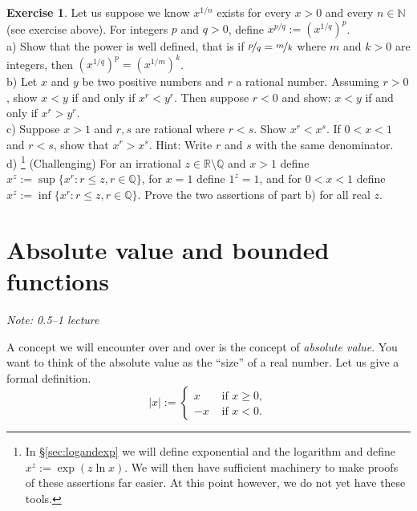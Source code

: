 \documentclass[12pt]{book}
\newcommand{\abs}[1]{\left\lvert {#1} \right\rvert}
\newcommand{\R}{{\mathbb{R}}}
\newcommand{\N}{{\mathbb{N}}}
\newcommand{\Q}{{\mathbb{Q}}}
\newcommand{\myindex}[1]{#1\index{#1}}
\newcommand{\sectionnotes}[1]{\noindent \emph{Note: #1} \medskip \par}
\newcommand{\sectionnewpage}{\clearpage}
\theoremstyle{plain}
\theoremstyle{remark}
\theoremstyle{definition}
\theoremstyle{exercise}
\newtheorem{exercise}{Exercise}[section]
\theoremstyle{example}
\newcommand{\sectionref}[1]{\hyperref[#1]{\S\ref*{#1}}}
\begin{document}
\begin{exercise} \label{exercise:realpower}
Let us suppose we know $x^{1/n}$ exists for every $x > 0$ and every $n \in
\N$ (see exercise above).  For integers $p$ and $q > 0$, define $x^{p/q} :=
{(x^{1/q})}^p$.\\
a) Show that the power is well defined, that is if $\nicefrac{p}{q} =
\nicefrac{m}{k}$ where $m$ and $k > 0$ are integers, then 
${(x^{1/q})}^p = {(x^{1/m})}^k$.
\\
b)
Let $x$ and $y$ be two positive numbers and $r$ a rational number.
Assuming $r > 0$, show
$x < y$ if and only if $x^r < y^r$.  Then suppose $r < 0$ and show:
$x < y$ if and only if $x^r > y^r$.
\\
c) 
Suppose $x > 1$ and $r,s$ are rational where $r < s$.
Show $x^r < x^s$.  If $0 < x < 1$ and $r < s$, show that $x^r > x^s$.
Hint: Write $r$ and $s$ with the same denominator.
\\
d)%
\footnote{In
\sectionref{sec:logandexp}
we will define exponential and the logarithm and
define $x^z := \exp(z \ln x)$.  We will then have 
sufficient machinery to make proofs of these assertions far easier.  At this
point however, we do not yet have these tools.}
(Challenging)
For an irrational $z \in \R \setminus \Q$ and $x > 1$ define
$x^z := \sup \{ x^r : r \leq z, r \in \Q \}$,
for $x=1$ define $1^z = 1$,
and for $0 < x < 1$ define
$x^z := \inf \{ x^r : r \leq z, r \in \Q \}$.
Prove the two assertions of part b) for all real $z$.
\end{exercise}




\sectionnewpage
\section{Absolute value and bounded functions} \label{sec:absval}

\sectionnotes{0.5--1 lecture}

A concept we will encounter over and over is the concept of
\emph{\myindex{absolute value}}.
You want to think of the absolute value as the ``size'' of a real number.
Let us give a formal definition.
\begin{equation*}
\abs{x} :=
\begin{cases}
x & \text{ if $x \geq 0$}, \\
-x & \text{ if $x < 0$} .
\end{cases}
\end{equation*}
\end{document}
